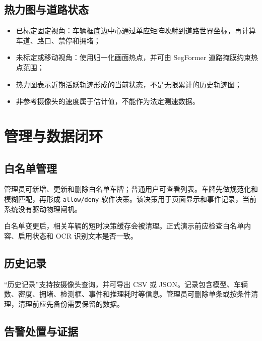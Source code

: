 \subsection{热力图与道路状态}\label{manual-ux70edux529bux56feux4e0eux9053ux8defux72b6ux6001}

\begin{itemize}
\tightlist
\item
  已标定固定视角：车辆框底边中心通过单应矩阵映射到道路世界坐标，再计算车道、路口、禁停和拥堵；
\item
  未标定或移动视角：使用归一化画面热点，并可由 SegFormer 道路掩膜约束热点范围；
\item
  热力图表示近期活跃轨迹形成的当前状态，不是无限累计的历史轨迹图；
\item
  非参考摄像头的速度属于估计值，不能作为法定测速数据。
\end{itemize}

\section{管理与数据闭环}\label{manual-ux7ba1ux7406ux4e0eux6570ux636eux95edux73af}

\subsection{白名单管理}\label{manual-ux767dux540dux5355ux7ba1ux7406}

管理员可新增、更新和删除白名单车牌；普通用户可查看列表。车牌先做规范化和模糊匹配，再形成 \texttt{allow/\allowbreak{}deny} 软件决策。该决策用于页面显示和事件记录，当前系统没有驱动物理闸机。

白名单变更后，相关车辆的短时决策缓存会被清理。正式演示前应检查白名单内容、启用状态和 OCR 识别文本是否一致。

\subsection{历史记录}\label{manual-ux5386ux53f2ux8bb0ux5f55}

``历史记录''支持按摄像头查询，并可导出 CSV 或 JSON。记录包含模型、车辆数、密度、拥堵、检测框、事件和推理耗时等信息。管理员可删除单条或按条件清理，清理前应先备份需要保留的数据。

\subsection{告警处置与证据}\label{manual-ux544aux8b66ux5904ux7f6eux4e0eux8bc1ux636e}

